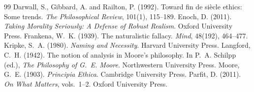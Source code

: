 \documentclass{situationist-preprint}
\begin{document}
\begin{thebibliography}{99}\small
{} Darwall, S., Gibbard, A. and Railton, P. (1992). Toward fin de si\`ecle ethics: Some trends. \emph{The Philosophical Review}, 101(1), 115--189.
 Enoch, D. (2011). \emph{Taking Morality Seriously: A Defense of Robust Realism}. Oxford University Press.
 Frankena, W.~K. (1939). The naturalistic fallacy. \emph{Mind}, 48(192), 464--477.
 Kripke, S.~A. (1980). \emph{Naming and Necessity}. Harvard University Press.
 Langford, C.~H. (1942). The notion of analysis in Moore's philosophy. In P.~A. Schilpp (ed.), \emph{The Philosophy of G.~E. Moore}. Northwestern University Press.
 Moore, G.~E. (1903). \emph{Principia Ethica}. Cambridge University Press.
 Parfit, D. (2011). \emph{On What Matters}, vols.~1--2. Oxford University Press.
\end{thebibliography}
\end{document}
